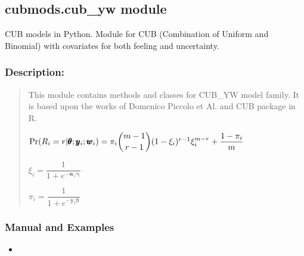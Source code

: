 \documentclass[letterpaper,10pt,english]{sphinxmanual}
\begin{document}
\subsection{cubmods.cub\_yw module}
\label{\detokenize{cubmods:module-cubmods.cub_yw}}\label{\detokenize{cubmods:cubmods-cub-yw-module}}\label{\detokenize{cubmods:cubyw-module}}
\sphinxAtStartPar
CUB models in Python.
Module for CUB (Combination of Uniform
and Binomial) with covariates
for both feeling and uncertainty.


\subsubsection{Description:}
\label{\detokenize{cubmods:id161}}\begin{quote}

\sphinxAtStartPar
This module contains methods and classes
for CUB\_YW model family.
It is based upon the works of Domenico
Piccolo et Al. and CUB package in R.

\sphinxAtStartPar
\(\Pr(R_i=r|\pmb{\theta} ; \pmb y_i ; \pmb w_i) = \pi_i \dbinom{m-1}{r-1}(1-\xi_i)^{r-1}\xi_i^{m-r}+\dfrac{1-\pi_i}{m}\)

\sphinxAtStartPar
\(\xi_i = \dfrac{1}{1+e^{-\pmb w_i \pmb\gamma}}\)

\sphinxAtStartPar
\(\pi_i = \dfrac{1}{1+e^{-\pmb y_i \pmb\beta}}\)
\end{quote}


\subsubsection{Manual and Examples}
\label{\detokenize{cubmods:id162}}\begin{itemize}
\item {} 
\sphinxAtStartPar
{}

\end{itemize}
\end{document}

